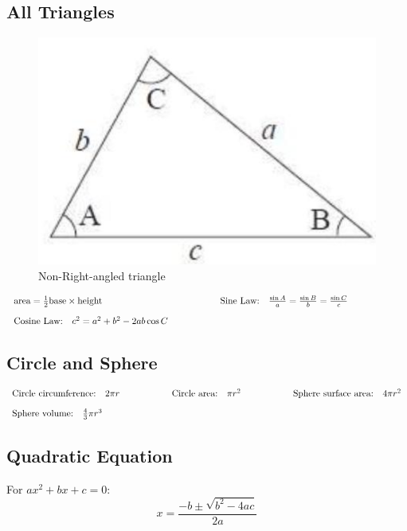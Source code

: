 \documentclass[12pt,a4paper]{article}
\begin{document}
\subsection{All Triangles}
\begin{figure}[H]
    \centering
    \includegraphics[width=0.4\linewidth]{phys12-formulas-newton-relativity-thermodynamics.png}
    \caption{Non-Right-angled triangle}
    \label{fig:Non-Right-angled triangle}
\end{figure}

\begin{align*}
  \begin{array}{l@{\hspace{2cm}}l@{\hspace{2cm}}l}
    \text{area} = \frac{1}{2} \text{base} \times \text{height} & \text{Sine Law:} \quad \frac{\sin A}{a} = \frac{\sin B}{b} = \frac{\sin C}{c} & \\[1em]
    \text{Cosine Law:} \quad c^2 = a^2 + b^2 - 2ab \cos C & &
  \end{array}
\end{align*}

\subsection{Circle and Sphere}
\begin{align*}
  \begin{array}{l@{\hspace{2cm}}l@{\hspace{2cm}}l}
    \text{Circle circumference:} \quad 2\pi r & \text{Circle area:} \quad \pi r^2 & \text{Sphere surface area:} \quad 4\pi r^2 \\[1em]
    \text{Sphere volume:} \quad \frac{4}{3}\pi r^3 & &
  \end{array}
\end{align*}

\subsection{Quadratic Equation}
For $ax^2 + bx + c = 0$: 
\[x = \frac{-b \pm \sqrt{b^2 - 4ac}}{2a}\]
\end{document}
